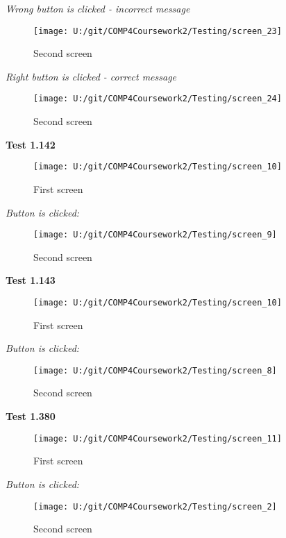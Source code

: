 \textit{Wrong button is clicked - incorrect message}

\begin{figure}[H]
    \label{fig: Second Screen}\caption{Second screen}
    \texttt{[image: U:/git/COMP4Coursework2/Testing/screen\_23]}
\end{figure}

\textit{Right button is clicked - correct message}

\begin{figure}[H]
    \label{fig: Second Screen}\caption{Second screen}
    \texttt{[image: U:/git/COMP4Coursework2/Testing/screen\_24]}
\end{figure}

\textbf{Test 1.142}

\begin{figure}[H]
    \label{fig: First Screen}\caption{First screen}
    \texttt{[image: U:/git/COMP4Coursework2/Testing/screen\_10]}
\end{figure}

\textit{Button is clicked: }

\begin{figure}[H]
    \label{fig: Second Screen}\caption{Second screen}
    \texttt{[image: U:/git/COMP4Coursework2/Testing/screen\_9]}
\end{figure}

\textbf{Test 1.143}

\begin{figure}[H]
    \label{fig: First Screen}\caption{First screen}
    \texttt{[image: U:/git/COMP4Coursework2/Testing/screen\_10]}
\end{figure}

\textit{Button is clicked: }

\begin{figure}[H]
    \label{fig: Second Screen}\caption{Second screen}
    \texttt{[image: U:/git/COMP4Coursework2/Testing/screen\_8]}
\end{figure}

\textbf{Test 1.380}

\begin{figure}[H]
    \label{fig: First Screen}\caption{First screen}
    \texttt{[image: U:/git/COMP4Coursework2/Testing/screen\_11]}
\end{figure}

\textit{Button is clicked: }

\begin{figure}[H]
    \label{fig: Second Screen}\caption{Second screen}
    \texttt{[image: U:/git/COMP4Coursework2/Testing/screen\_2]}
\end{figure}

